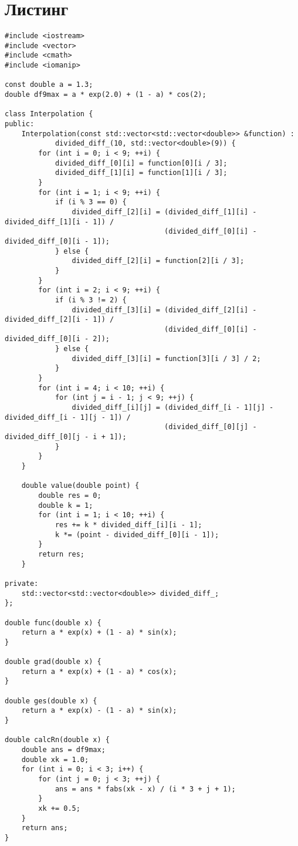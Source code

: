 \documentclass[10pt]{scrartcl}
\makeatletter
\newcommand{\verbatimfont}[1]{\renewcommand{\verbatim@font}{\ttfamily#1}}
\makeatother
\begin{document}
\section*{Листинг}
\verbatimfont{\small}
\begin{verbatim}
#include <iostream>
#include <vector>
#include <cmath>
#include <iomanip>

const double a = 1.3;
double df9max = a * exp(2.0) + (1 - a) * cos(2);

class Interpolation {
public:
    Interpolation(const std::vector<std::vector<double>> &function) :
            divided_diff_(10, std::vector<double>(9)) {
        for (int i = 0; i < 9; ++i) {
            divided_diff_[0][i] = function[0][i / 3];
            divided_diff_[1][i] = function[1][i / 3];
        }
        for (int i = 1; i < 9; ++i) {
            if (i % 3 == 0) {
                divided_diff_[2][i] = (divided_diff_[1][i] - divided_diff_[1][i - 1]) /
                                      (divided_diff_[0][i] - divided_diff_[0][i - 1]);
            } else {
                divided_diff_[2][i] = function[2][i / 3];
            }
        }
        for (int i = 2; i < 9; ++i) {
            if (i % 3 != 2) {
                divided_diff_[3][i] = (divided_diff_[2][i] - divided_diff_[2][i - 1]) /
                                      (divided_diff_[0][i] - divided_diff_[0][i - 2]);
            } else {
                divided_diff_[3][i] = function[3][i / 3] / 2;
            }
        }
        for (int i = 4; i < 10; ++i) {
            for (int j = i - 1; j < 9; ++j) {
                divided_diff_[i][j] = (divided_diff_[i - 1][j] - divided_diff_[i - 1][j - 1]) /
                                      (divided_diff_[0][j] - divided_diff_[0][j - i + 1]);
            }
        }
    }

    double value(double point) {
        double res = 0;
        double k = 1;
        for (int i = 1; i < 10; ++i) {
            res += k * divided_diff_[i][i - 1];
            k *= (point - divided_diff_[0][i - 1]);
        }
        return res;
    }

private:
    std::vector<std::vector<double>> divided_diff_;
};

double func(double x) {
    return a * exp(x) + (1 - a) * sin(x);
}

double grad(double x) {
    return a * exp(x) + (1 - a) * cos(x);
}

double ges(double x) {
    return a * exp(x) - (1 - a) * sin(x);
}

double calcRn(double x) {
    double ans = df9max;
    double xk = 1.0;
    for (int i = 0; i < 3; i++) {
        for (int j = 0; j < 3; ++j) {
            ans = ans * fabs(xk - x) / (i * 3 + j + 1);
        }
        xk += 0.5;
    }
    return ans;
}


\end{verbatim}
\end{document}
